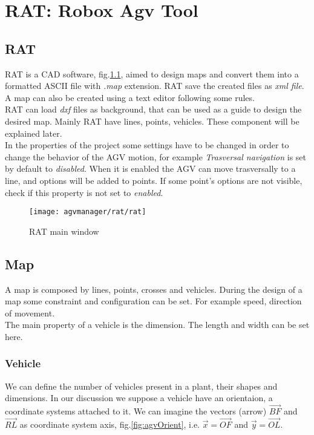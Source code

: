 

\chapter{RAT: Robox Agv Tool}

\section{RAT}
RAT is a CAD software, fig.\ref{fig:refRat}, aimed to design maps and convert them into a formatted ASCII file with \textit{.map} extension. RAT save the created files as \textit{xml file}. A map can also be created using a text editor following some rules.\\

RAT can load \textit{dxf} files as background, that can be used as a guide to design the desired map. Mainly RAT have lines, points, vehicles. These component will be explained later.\\
		
In the properties of the project some settings have to be changed in order to change the behavior of the AGV motion, for example \textit{Trasversal navigation} is set by default to \textit{disabled}. When it is enabled the AGV can move trasversally to a line, and options will be added to points. If some point's options are not visible, check if this property is not set to \textit{enabled}.\\

\begin{figure}[h]
	\centering\texttt{[image: agvmanager/rat/rat]}
	\caption{RAT main window}
	\label{fig:refRat}
\end{figure}

\section{Map}
A map is composed by lines, points, crosses and vehicles. During the design of a map some constraint and configuration can be set. For example speed, direction of movement.\\
The main property of a vehicle is the dimension. The length and width can be set here.

\subsection{Vehicle}
We can define the number of vehicles present in a plant, their shapes and dimensions. In our discussion we suppose a vehicle have an orientaion, a coordinate systems attached to it. We can imagine the vectors (arrow) $\overrightarrow{BF}$ and $\overrightarrow{RL}$ as coordinate system axis, fig.\ref{fig:agvOrient}, i.e. $\overrightarrow{x}=\overrightarrow{OF}$ and $\overrightarrow{y}=\overrightarrow{OL}$.\\

